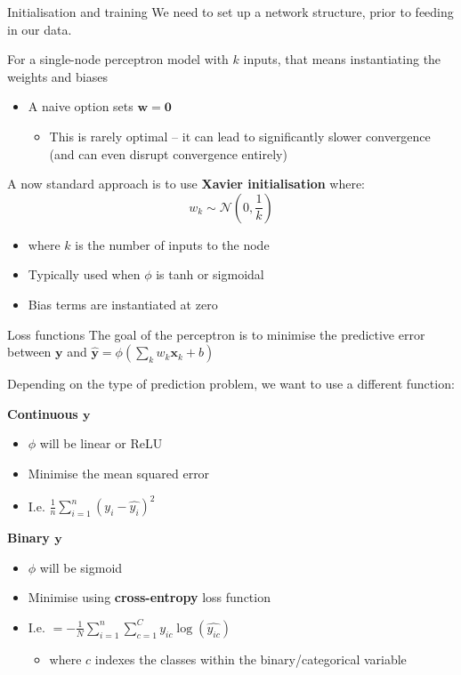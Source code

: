 \documentclass[
  ignorenonframetext,
]{beamer}
\providecommand{\tightlist}{%
  \setlength{\itemsep}{0pt}\setlength{\parskip}{0pt}}
\begin{document}
\begin{frame}{Initialisation and training}
\protect\hypertarget{initialisation-and-training}{}
We need to set up a network structure, prior to feeding in our data.

For a single-node perceptron model with \(k\) inputs, that means
instantiating the weights and biases

\begin{itemize}
\item
  A naive option sets \(\bm{w} = \bm{0}\)

  \begin{itemize}
  \tightlist
  \item
    This is rarely optimal -- it can lead to significantly slower
    convergence (and can even disrupt convergence entirely)
  \end{itemize}
\end{itemize}

A now standard approach is to use \textbf{Xavier initialisation} where:
\[
w_k \sim \mathcal{N}(0,\frac{1}{k})
\]

\begin{itemize}
\tightlist
\item
  where \(k\) is the number of inputs to the node
\item
  Typically used when \(\phi\) is tanh or sigmoidal
\item
  Bias terms are instantiated at zero
\end{itemize}
\end{frame}

\begin{frame}{Loss functions}
\protect\hypertarget{loss-functions}{}
The goal of the perceptron is to minimise the predictive error between
\(\bm{y}\) and \(\bm{\hat{y}} = \phi(\sum_k{w_k\bm{x}_k} + b)\)

Depending on the type of prediction problem, we want to use a different
function:

\textbf{Continuous \(\bm{y}\)}

\begin{itemize}
\tightlist
\item
  \(\phi\) will be linear or ReLU
\item
  Minimise the mean squared error
\item
  I.e. \(\frac{1}{n}\sum_{i=1}^{n}(y_i - \hat{y_i})^2\)
\end{itemize}

\textbf{Binary \(\bm{y}\)}

\begin{itemize}
\tightlist
\item
  \(\phi\) will be sigmoid
\item
  Minimise using \textbf{cross-entropy} loss function
\item
  I.e.
  \(=-\frac{1}{N}\sum_{i=1}^n\sum_{c=1}^{C}{y_{ic}\log(\hat{y_{ic}})}\)

  \begin{itemize}
  \tightlist
  \item
    where \(c\) indexes the classes within the binary/categorical
    variable
  \end{itemize}
\end{itemize}
\end{frame}
\end{document}
